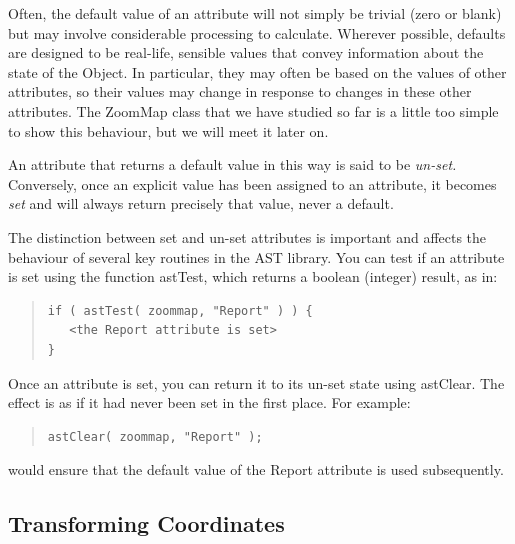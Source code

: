 \documentclass[twoside,11pt]{article}
\newcommand{\htmlref}[2]{#1}
\begin{document}
Often, the default value of an attribute will not simply be trivial
(zero or blank) but may involve considerable processing to
calculate. Wherever possible, defaults are designed to be real-life,
sensible values that convey information about the state of the
Object. In particular, they may often be based on the values of other
attributes, so their values may change in response to changes in these
other attributes. The \htmlref{ZoomMap}{ZoomMap} class that we have studied so far is a
little too simple to show this behaviour, but we will meet it later
on.

An attribute that returns a default value in this way is said to be
{\em{un-set.}} Conversely, once an explicit value has been assigned to
an attribute, it becomes {\em{set}} and will always return precisely
that value, never a default.

The distinction between set and un-set attributes is important and
affects the behaviour of several key routines in the AST library. You
can test if an attribute is set using the function \htmlref{astTest}{astTest}, which
returns a boolean (integer) result, as in:

\begin{quote}
\small
\begin{verbatim}
if ( astTest( zoommap, "Report" ) ) {
   <the Report attribute is set>
}
\end{verbatim}
\normalsize
\end{quote}


Once an attribute is set, you can return it to its un-set state using
\htmlref{astClear}{astClear}. The effect is as if it had never been set in the first
place. For example:

\begin{quote}
\small
\begin{verbatim}
astClear( zoommap, "Report" );
\end{verbatim}
\normalsize
\end{quote}

would ensure that the default value of the \htmlref{Report}{Report} attribute is used
subsequently.


\subsection{\label{ss:transforming}Transforming Coordinates}
\end{document}
